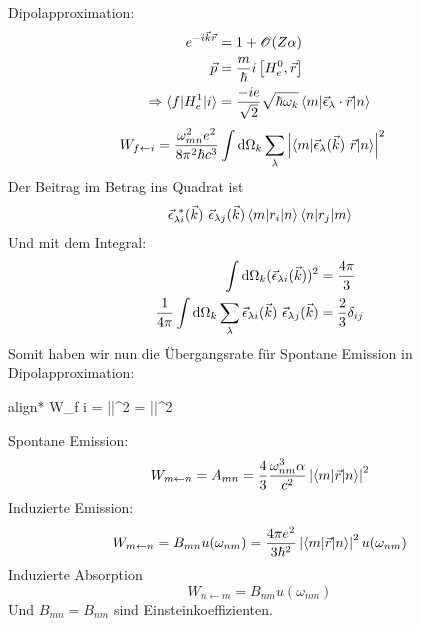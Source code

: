 		Dipolapproximation:
		\begin{align*}
		e^{-i \vec{k} \vec{r}} &= 1 + \mathscr{O} (Z\alpha) \\
		\vec{p} &= \frac{m}{\hbar} i \left[H_e^0, \vec{r}\right] \\
		\Rightarrow 
		\braket{f | H_e^1 | i} &= 
		\frac{-i e}{\sqrt{2}} \sqrt{\hbar \omega_k} 
		\braket{m | \vec{\epsilon}_\lambda \cdot \vec{r}| n}
		\end{align*}
		\begin{align*}
		W_{f \leftarrow i} &= \frac{\omega_{mn}^2 e^2}{8 \pi^2 \hbar c^3}
		\int \mathrm{d} \Omega_k \sum_\lambda \left|\braket{m | \vec{\epsilon}_\lambda (\vec{k}) ~\vec{r} | n}\right|^2
		\end{align*}
		Der Beitrag im Betrag ins Quadrat ist
		\begin{align*}
		\vec{\epsilon}_{\lambda i}^{~*} (\vec{k}) ~\vec{\epsilon}_{\lambda j} (\vec{k}) 
		\braket{m | r_i | n} \braket{n | r_j | m}
		\end{align*}
		Und mit dem Integral:
		\begin{align*}
		\int \mathrm{d} \Omega_k (\vec{\epsilon}_{\lambda i}(\vec{k}))^2 &= \frac{4 \pi}{3} \\
		\frac{1}{4 \pi} \int \mathrm{d} \Omega_k \sum_\lambda 
		\vec{\epsilon}_{\lambda i} (\vec{k}) ~\vec{\epsilon}_{\lambda j} (\vec{k}) 
		&= \frac{2}{3} \delta_{ij}
		\end{align*}
		Somit haben wir nun die Übergangsrate für Spontane Emission in Dipolapproximation:
		\begin{empheq}[box=\boxed]{align*}
		W_{f \leftarrow i} = 
		\left|\right|^2 
		=  
		\left|\right|^2
		\end{empheq}
		Spontane Emission:
		\begin{equation*}
		W_{m \leftarrow n} = A_{mn} = \frac{4}{3} \frac{\omega_{nm}^3 \alpha}{c^2}
		\left|\braket{m | \vec{r} | n}\right|^2
		\end{equation*}
		Induzierte Emission:
		\begin{equation*}
		W_{m \leftarrow n} = B_{mn} u (\omega_{nm})
		= \frac{4 \pi e^2}{3 \hbar^2} \left|\braket{m | \vec{r} | n}\right|^2
		u (\omega_{nm})
		\end{equation*}
		Induzierte Absorption
		\begin{equation*}
		W_{n \leftarrow m} = B_{nm} u(\omega_{nm})
		\end{equation*}
		Und $B_{mn} = B_{nm}$ sind Einsteinkoeffizienten.
		
